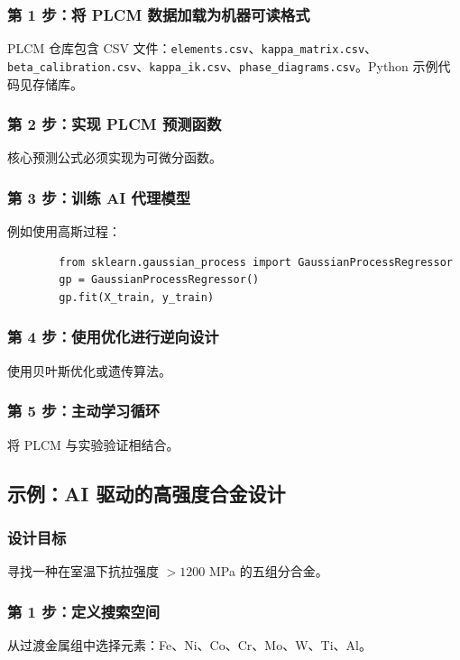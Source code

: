 \documentclass[12pt,a4paper]{article}
\begin{document}
	\subsubsection{第 1 步：将 PLCM 数据加载为机器可读格式}
	PLCM 仓库包含 CSV 文件：\texttt{elements.csv}、\texttt{kappa\_matrix.csv}、\texttt{beta\_calibration.csv}、\texttt{kappa\_ik.csv}、\texttt{phase\_diagrams.csv}。Python 示例代码见存储库。
	
	\subsubsection{第 2 步：实现 PLCM 预测函数}
	核心预测公式必须实现为可微分函数。
	
	\subsubsection{第 3 步：训练 AI 代理模型}
	例如使用高斯过程：
	\begin{verbatim}
		from sklearn.gaussian_process import GaussianProcessRegressor
		gp = GaussianProcessRegressor()
		gp.fit(X_train, y_train)
	\end{verbatim}
	
	\subsubsection{第 4 步：使用优化进行逆向设计}
	使用贝叶斯优化或遗传算法。
	
	\subsubsection{第 5 步：主动学习循环}
	将 PLCM 与实验验证相结合。
	
	\subsection{示例：AI 驱动的高强度合金设计}
	
	\subsubsection{设计目标}
	寻找一种在室温下抗拉强度 \(> 1200\) MPa 的五组分合金。
	
	\subsubsection{第 1 步：定义搜索空间}
	从过渡金属组中选择元素：Fe、Ni、Co、Cr、Mo、W、Ti、Al。
	
\end{document}
